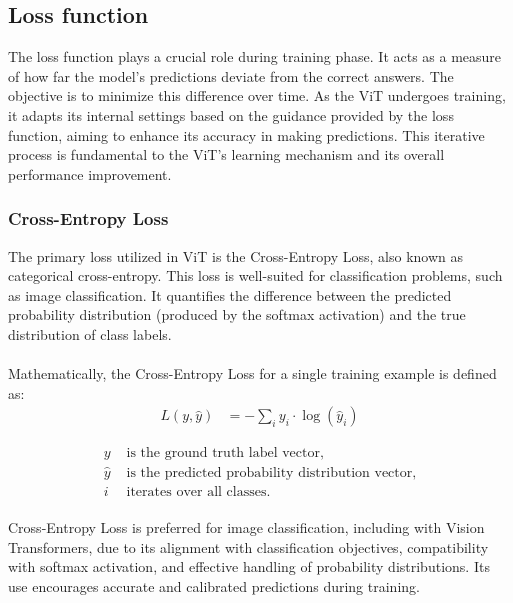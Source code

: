 \subsection{Loss function }
The loss function plays a crucial role during training phase. It acts as a measure of how far the model's predictions deviate from the correct answers. The objective is to minimize this difference over time. As the ViT undergoes training, it adapts its internal settings based on the guidance provided by the loss function, aiming to enhance its accuracy in making predictions. This iterative process is fundamental to the ViT's learning mechanism and its overall performance improvement.

\subsubsection{Cross-Entropy Loss}
The primary loss utilized in ViT is the Cross-Entropy Loss, also known as categorical cross-entropy. This loss is well-suited for classification problems, such as image classification. It quantifies the difference between the predicted probability distribution (produced by the softmax activation) and the true distribution of class labels.
\\
\\
Mathematically, the Cross-Entropy Loss for a single training example is defined as:
\\

\begin{align}
    L(y, \hat{y}) & = -\sum_i y_i \cdot \log(\hat{y}_i) \label{eq:loss_function}
\end{align}


\begin{align*}
    y       & \text{ is the ground truth label vector,}                 \\
    \hat{y} & \text{ is the predicted probability distribution vector,} \\
    i       & \text{ iterates over all classes.}
\end{align*}
\\
Cross-Entropy Loss is preferred for image classification, including with Vision Transformers, due to its alignment with classification objectives, compatibility with softmax activation, and effective handling of probability distributions. Its use encourages accurate and calibrated predictions during training.
